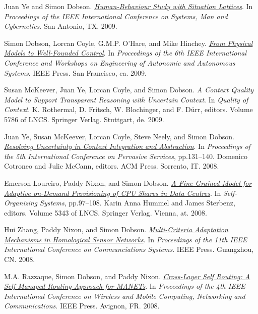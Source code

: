 \documentclass[11pt]{article}
\begin{document}
\label{org743f469}Juan Ye and Simon Dobson.  \emph{\href{https://simondobson.org/softcopy/SMC2009.pdf}{Human-Behaviour Study with Situation Lattices}}. In \emph{Proceedings of the IEEE International Conference on Systems, Man and Cybernetics}. San Antonio, TX. 2009.

\label{orgfdfa92c}Simon Dobson, Lorcan Coyle, G.M.P. O’Hare, and Mike Hinchey.  \emph{\href{https://simondobson.org/softcopy/well-founded-control.pdf}{From Physical Models to Well-Founded Control}}. In \emph{Proceedings of the 6th IEEE International Conference and Workshops on Engineering of Autonomic and Autonomous Systems}. IEEE Press. San Francisco, ca. 2009.

\label{org1c9aa94}Susan McKeever, Juan Ye, Lorcan Coyle, and Simon Dobson.  \emph{A Context Quality Model to Support Transparent Reasoning with Uncertain Context}. In \emph{Quality of Context}. K. Rothermal, D. Fritsch, W. Blochinger, and F. Dürr, editors. Volume 5786 of LNCS. Springer Verlag. Stuttgart, de. 2009.

\label{org6532e18}Juan Ye, Susan McKeever, Lorcan Coyle, Steve Neely, and Simon Dobson.  \emph{\href{https://simondobson.org/softcopy/icps-08.pdf}{Resolving Uncertainty in Context Integration and Abstraction}}. In \emph{Proceedings of the 5th International Conference on Pervasive Services}, pp.131–140. Domenico Cotroneo and Julie McCann, editors. ACM Press. Sorrento, IT. 2008.

\label{org83c9b5b}Emerson Loureiro, Paddy Nixon, and Simon Dobson.  \emph{\href{https://simondobson.org/softcopy/iwsos-08.pdf}{A Fine-Grained Model for Adaptive on-Demand Provisioning of CPU Shares in Data Centres}}. In \emph{Self-Organizing Systems}, pp.97–108. Karin Anna Hummel and James Sterbenz, editors. Volume 5343 of LNCS. Springer Verlag. Vienna, at. 2008.

\label{org8b52a53}Hui Zhang, Paddy Nixon, and Simon Dobson.  \emph{\href{https://simondobson.org/softcopy/iccs-08.pdf}{Multi-Criteria Adaptation Mechanisms in Homological Sensor Networks}}. In \emph{Proceedings of the 11th IEEE International Conference on Communciations Systems}. IEEE Press. Guangzhou, CN. 2008.

\label{orge6172ac}M.A. Razzaque, Simon Dobson, and Paddy Nixon.  \emph{\href{https://simondobson.org/softcopy/clsr-08.pdf}{Cross-Layer Self Routing: A Self-Managed Routing Approach for MANETs}}. In \emph{Proceedings of the 4th IEEE International Conference on Wireless and Mobile Computing, Networking and Communications}. IEEE Press. Avignon, FR. 2008.
\end{document}
